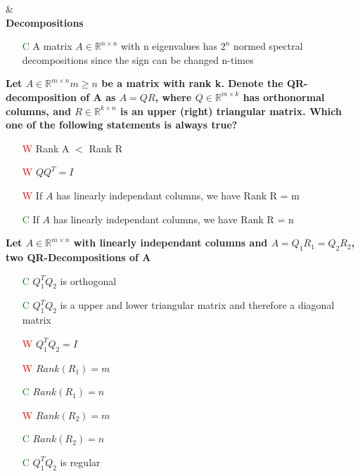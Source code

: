 \documentclass[7pt,landscape, margin = 0.1mm]{article}
\begin{document}
\begin{multicols}{4}
\begin{flushleft}
\hspace{3mm}
\hline & \\[3mm]
\scriptsize
\textbf{Decompositions}
\tiny \\
\begin{itemize}
\item[\textcolor{green}{C}]A matrix $A \in \mathbb{R}^{n \times n} $ with n eigenvalues has $2^n$ normed spectral decompositions
\textcolor{Emerald}{since the sign can be changed n-times}
\end{itemize}
\hspace{3mm}


\textbf{  Let $A  \in \mathbb{R}^{m \times n}  m \geq n$ be a matrix with rank k. Denote the QR-decomposition of A as $A = QR$,
where $Q \in \mathbb{R}^{m \times k} $ has orthonormal columns, and $R \in \mathbb{R}^{k \times n} $  is an upper (right) triangular matrix. Which
one of the following statements is always true? }
\begin{itemize}
\item[\textcolor{red}{W}]  Rank A $<$ Rank R
\item[\textcolor{red}{W}] $QQ^T = I $
\item[\textcolor{red}{W}]  If $A$ has linearly independant columns, we have Rank R = m
\item[\textcolor{green}{C}]  If $A$ has linearly independant columns, we have Rank R = n
\end{itemize}
\hspace{3mm}
\textbf{Let $A  \in \mathbb{R}^{m \times n} $ with linearly independant columns and $A=Q_1 R_1 = Q_2 R_2$, two QR-Decompositions of A }
\begin{itemize}
\item[\textcolor{green}{C}] $Q_{1}^TQ_2 $ is orthogonal
\item[\textcolor{green}{C}] $Q_{1}^TQ_2 $ is a upper and lower triangular matrix and therefore a diagonal  matrix
\item[\textcolor{red}{W}] $Q_{1}^TQ_2 =I$
\item[\textcolor{red}{W}]  $Rank (R_1)=m $
\item[\textcolor{green}{C}]  $Rank (R_1)=n $
\item[\textcolor{red}{W}]  $Rank (R_2)=m $
\item[\textcolor{green}{C}]  $Rank (R_2)=n $
\item[\textcolor{green}{C}]  $Q_{1}^TQ_2 $ is regular
\end{itemize}



\end{flushleft}
\end{multicols}
\end{document}
